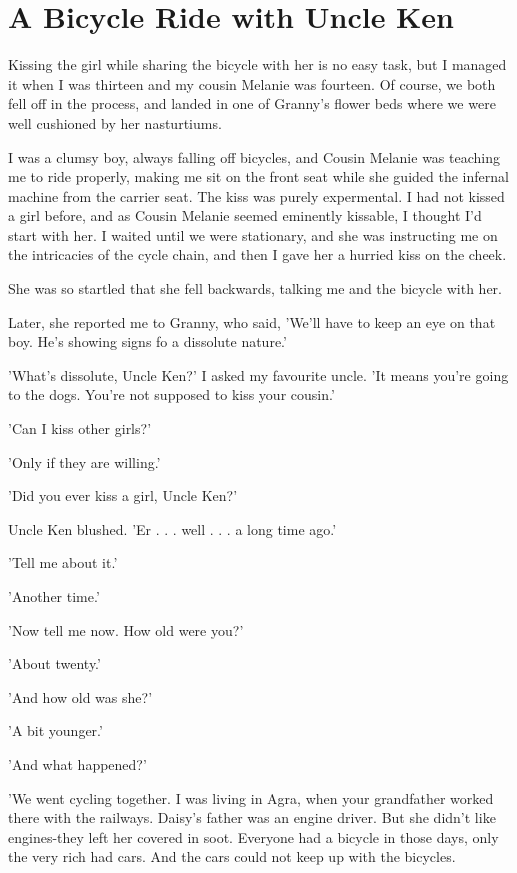 \chapter{A Bicycle Ride with Uncle Ken}
Kissing the girl while sharing the bicycle with her is no easy task, but I managed it when I was thirteen and my cousin Melanie was fourteen. Of course, we both fell off in the process, and landed in one of Granny's flower beds where we were well cushioned by her nasturtiums.
\par
I was a clumsy boy, always falling off bicycles, and Cousin Melanie was teaching me to ride properly, making me sit on the front seat while she guided the infernal machine from the carrier seat. The kiss was purely expermental. I had not kissed a girl before, and as Cousin Melanie seemed eminently kissable, I thought I'd start with her. I waited until we were stationary, and she was instructing me on the intricacies of the cycle chain, and then I gave her a hurried kiss on the cheek.
\par
She was so startled that she fell backwards, talking me and the bicycle with her.
\par
Later, she reported me to Granny, who said, 'We'll have to keep an eye on that boy. He's showing signs fo a dissolute nature.'
\par
'What's dissolute, Uncle Ken?' I asked my favourite uncle.
'It means you're going to the dogs. You're not supposed to kiss your cousin.'
\par
'Can I kiss other girls?'
\par
'Only if they are willing.'
\par
'Did you ever kiss a girl, Uncle Ken?'
\par
Uncle Ken blushed. 'Er . . . well . . . a long time ago.'
\par
'Tell me about it.'
\par
'Another time.'
\par
'Now tell me now. How old were you?'
\par
'About twenty.'
\par
'And how old was she?'
\par
'A bit younger.'
\par
'And what happened?'
\par
'We went cycling together. I was living in Agra, when your grandfather worked there with the railways. Daisy's father was an engine driver. But she didn't like engines-they left her covered in soot. Everyone had a bicycle in those days, only the very rich had cars. And the cars could not keep up with the bicycles.
